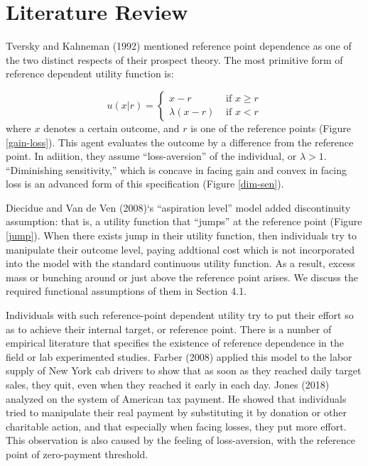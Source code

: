 \documentclass[dvipdfmx, 12pt]{article}
\begin{document}
\section{Literature Review}

  Tversky and Kahneman (1992) mentioned reference point dependence as one of the two distinct respects of their prospect theory. The most primitive form of reference dependent utility function is:

   \[
  u(x | r) = \begin{cases}
  x - r & \text{ if }x \geq r \\
  \lambda (x - r) & \text{ if }x < r
\end{cases}
  \]
  where $x$ denotes a certain outcome, and $r$ is one of the reference points (Figure \ref{gain-loss}). This agent evaluates the outcome by a difference from the reference point. In adiition, they assume ``loss-aversion'' of the individual, or $\lambda > 1$. %
  ``Diminishing sensitivity,'' which is concave in facing gain and convex in facing loss is an advanced form of this specification (Figure \ref{dim-sen}).

  Diecidue and Van de Ven (2008)`s ``aspiration level'' model added discontinuity assumption: that is, a utility function that ``jumps'' at the reference point (Figure \ref{jump}). When there exists jump in their utility function, then individuals try to manipulate their outcome level, paying addtional cost which is not incorporated into the model with the standard continuous utility function. As a result,  excess mass or bunching around or just above the reference point arises. We discuss the required functional assumptions of them in Section 4.1.

  Individuals with such reference-point dependent utility try to put their effort so as to achieve their internal target, or reference point. There is a number of empirical literature that specifies the existence of reference dependence in the field or lab experimented studies. Farber (2008) applied this model to the labor supply of New York cab drivers to show that as soon as they reached daily target sales, they quit, even when they reached it early in each day. Jones (2018) analyzed on the system of American tax payment. He showed that individuals tried to manipulate their real payment by substituting it by donation or other charitable action, and that especially when facing losses, they put more effort. This observation is also caused by the feeling of loss-aversion, with the reference point of zero-payment threshold.
\end{document}

